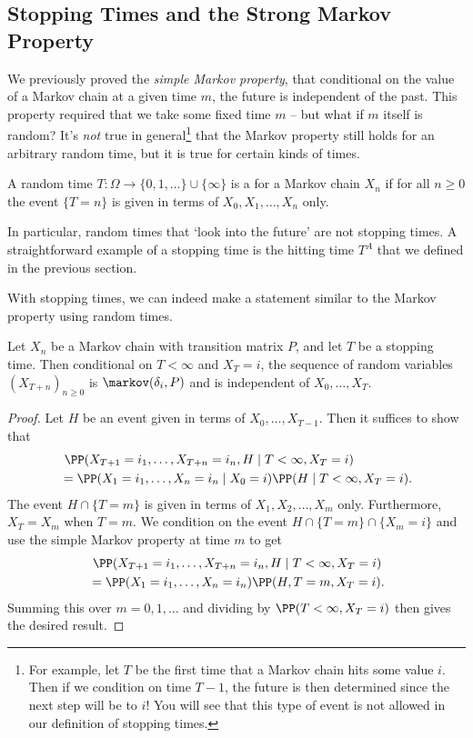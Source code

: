 \documentclass[a4paper]{scrartcl}
\begin{document}
\subsection{Stopping Times and the Strong Markov Property}

We previously proved the \emph{simple Markov property}, that 
conditional on the value of a Markov chain at a given time $m$, the future is independent of the past.
This property required that we take some fixed time $m$ -- but what if $m$ itself is random? It's \emph{not} true in general\footnote{For example, let $T$ be the first time that a Markov chain hits some value $i$. Then if we condition on time $T - 1$, the future is then determined since the next step will be to $i$! You will see that this type of event is not allowed in our definition of stopping times.} that the Markov property still holds for an arbitrary random time, but it is true for certain kinds of times.

\begin{definition}
	A random time $T : \Omega \rightarrow \{0, 1, \dots\} \cup \{\infty\}$ is a  for a Markov chain $X_n$ if for all $n \geq 0$ the event $\{T = n\}$ is given in terms of $X_0, X_1, \dots, X_n$ only.
\end{definition}

In particular, random times that `look into the future' are not stopping times. A straightforward example of a stopping time is the hitting time $T^A$ that we defined in the previous section.

With stopping times, we can indeed make a statement similar to the Markov property using random times.

\begin{theorem}	
Let $X_n$ be a Markov chain with transition matrix $P$, and let $T$ be a stopping time. Then conditional on $T < \infty$ and $X_T = i$, the sequence of random variables $(X_{T + n})_{n \geq 0}$ is $\markov(\delta_i, P)$ and is independent of $X_0, \dots, X_T$.
\end{theorem}
\begin{proof}
Let $H$ be an event given in terms of $X_0, \dots, X_{T - 1}$. Then it suffices to show that
\begin{align*}
	&\ \PP(X_{T + 1} = i_1, \dots, X_{T + n} = i_n, H \mid T < \infty, X_T = i)  \\
	&= \PP(X_1 = i_1, \dots, X_n = i_n \mid X_0 = i) \PP(H \mid T < \infty, X_T = i).
\end{align*}
The event $H \cap \{T = m\}$ is given in terms of $X_1, X_2, \dots, X_m$ only. Furthermore, $X_T = X_m$ when $T = m$. We condition on the event $H \cap \{T = m\} \cap \{X_m = i\}$ and use the simple Markov property at time $m$ to get
\begin{align*}
&\ \PP(X_{T + 1} = i_1, \dots, X_{T + n} = i_n, H \mid T < \infty, X_T = i) \\
&= \PP(X_1 = i_1, \dots, X_n = i_n) \PP(H, T = m, X_T = i).
\end{align*}
Summing this over $m = 0, 1, \dots$ and dividing by $\PP(T < \infty, X_T = i)$ then gives the desired result.
\end{proof}
\end{document}

